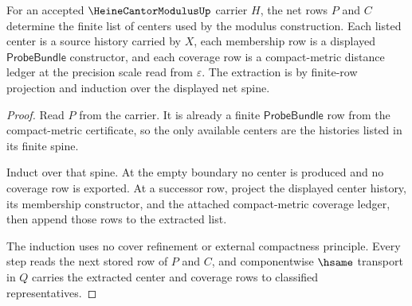 \begin{theorem}
\label{thm:heine-cantor-modulus-finite-net-extraction}
For an accepted $\HeineCantorModulusUp$ carrier $H$, the net rows
$P$ and $C$ determine the finite list of centers used by the modulus
construction. Each listed center is a source history carried by $X$, each
membership row is a displayed $\mathsf{ProbeBundle}$ constructor, and each
coverage row is a compact-metric distance ledger at the precision scale read
from $\varepsilon$. The extraction is by finite-row projection and induction
over the displayed net spine.
\end{theorem}
\begin{proof}
Read $P$ from the carrier. It is already a finite $\mathsf{ProbeBundle}$ row
from the compact-metric certificate, so the only available centers are the
histories listed in its finite spine.

Induct over that spine. At the empty boundary no center is produced and no
coverage row is exported. At a successor row, project the displayed center
history, its membership constructor, and the attached compact-metric coverage
ledger, then append those rows to the extracted list.

The induction uses no cover refinement or external compactness principle.
Every step reads the next stored row of $P$ and $C$, and componentwise
$\hsame$ transport in $Q$ carries the extracted center and coverage rows to
classified representatives.
\end{proof}

